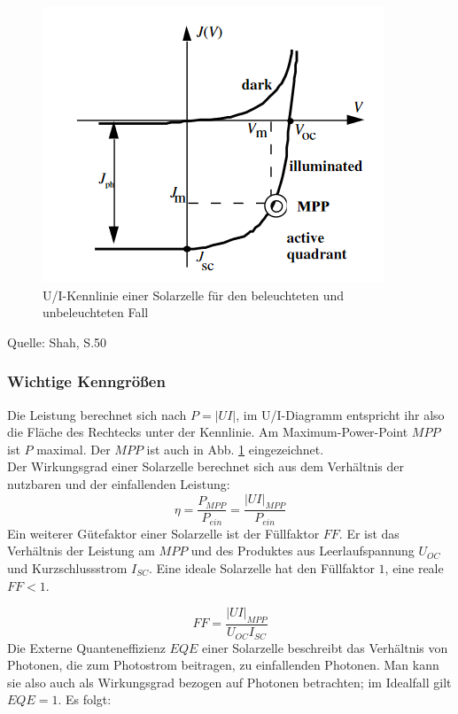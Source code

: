 \begin{figure}[h]
    \centering
    \includegraphics[scale=0.75]{Bilder/Kennlinien.png}
    \caption{U/I-Kennlinie einer Solarzelle für den beleuchteten und unbeleuchteten Fall}
    \label{bild:kennlinien}
\end{figure}

Quelle: Shah, S.50

\subsubsection{Wichtige Kenngrößen}
Die Leistung berechnet sich nach $P = |UI|$, im U/I-Diagramm entspricht ihr also die Fläche des Rechtecks unter der Kennlinie. Am Maximum-Power-Point $MPP$ ist $P$ maximal. Der $MPP$ ist auch in Abb. \ref{bild:kennlinien} eingezeichnet. \\
Der Wirkungsgrad einer Solarzelle berechnet sich aus dem Verhältnis der nutzbaren und der einfallenden Leistung:
\begin{equation*}
\eta = \frac{P_{MPP}}{P_{ein}} = \frac{|UI|_{MPP}}{P_{ein}}
\end{equation*}
Ein weiterer Gütefaktor einer Solarzelle ist der Füllfaktor $FF$. Er ist das Verhältnis der Leistung am $MPP$ und des Produktes aus Leerlaufspannung $U_{OC}$ und Kurzschlussstrom $I_{SC}$. Eine ideale Solarzelle hat den Füllfaktor $1$, eine reale $FF < 1$.

\begin{equation*}
FF = \frac{|UI|_{MPP}}{U_{OC} I_{SC}}
\end{equation*}
Die Externe Quanteneffizienz $EQE$ einer Solarzelle beschreibt das Verhältnis von Photonen, die zum Photostrom beitragen, zu einfallenden Photonen. Man kann sie also auch als Wirkungsgrad bezogen auf Photonen betrachten; im Idealfall gilt $EQE = 1$. Es folgt:

